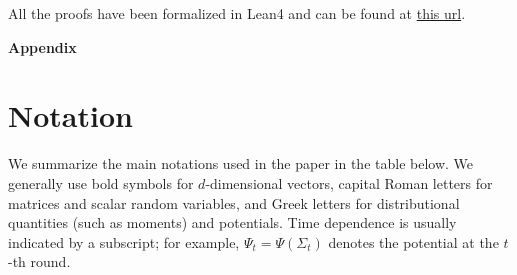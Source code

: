 \documentclass[11pt]{article}
\begin{document}
All the proofs have been formalized in Lean4 and can be found at \href{http://github.com/renatoppl/trace-square-root}{this url}.



\clearpage





\clearpage

\appendix 
{\noindent \LARGE \textbf{Appendix}}
\section{Notation}\label{ap:nota} 

We summarize the main notations used in the paper in the table below. We generally use bold symbols for $d$-dimensional vectors, capital Roman letters for matrices and scalar random variables, and Greek letters for distributional quantities (such as moments) and potentials. Time dependence is usually indicated by a subscript; for example, $\Psi_t=\Psi(\Sigma_t)$ denotes the potential at the $t$-th round.
\end{document}
